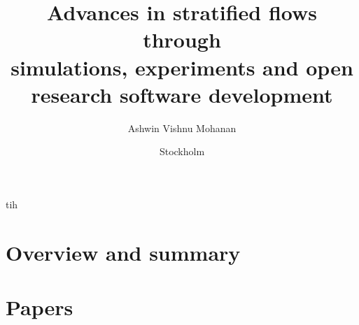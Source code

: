 \documentclass{./templates/mechthesis/MechThesis}
\title[%
  Advances in stratified flows through simulations, experiments and open research software development%
]%
{%
  Advances in stratified flows \\ through \\ simulations, experiments and open research software development%
}%
\author{Ashwin Vishnu Mohanan}%
\affiliation
{%
	Linn\'e FLOW Centre, KTH Royal Institute of Technology, Department of Mechanics\\
	SE--100 44 Stockholm, Sweden%
}%
\date{Stockholm}{{June}}{{2019}}%
\begin{document}
%
\frontmatter



tih
%
\mainmatter

\part{Overview and summary}

%
\begin{refsection}
  
\end{refsection}

%
\tocpagebreak


%
\part{Papers}

%
\makepapersummary
\cleardoublepage

%
\begin{refsection}
 
\end{refsection}

\begin{refsection}
 
\end{refsection}

\begin{refsection}
 
\end{refsection}

\begin{refsection}
 
\end{refsection}

\begin{refsection}
 
\end{refsection}

\end{document}
